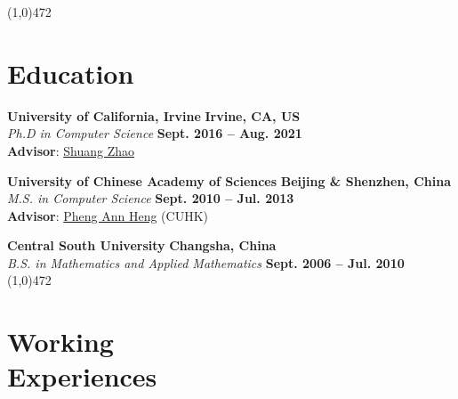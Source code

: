 \documentclass[margin,line]{resume}
\begin{document}
\begin{resume}
    \vspace{-5.0mm}
    \line(1,0){472}
    \vspace{-5.0mm}

    \section{\mysidestyle Education}
    \textbf{University of California, Irvine}       \hfill \textbf{Irvine, CA, US}  \\
    \textsl{Ph.D in Computer Science} 															\hfill \textbf{Sept. 2016 -- Aug. 2021} \\
    \textbf{Advisor}: \href{https://shuangz.com/}{Shuang Zhao} 

    \vspace{-2.0mm}

    \textbf{University of Chinese Academy of Sciences}  \hfill \textbf{Beijing \& Shenzhen, China}\\
    \textsl{M.S. in Computer Science}                 \hfill \textbf{Sept. 2010 -- Jul. 2013} \\
	\textbf{Advisor}: \href{http://www.cse.cuhk.edu.hk/~pheng/}{Pheng Ann Heng} (CUHK)

    \vspace{-2.0mm}

    \textbf{Central South University}      \hfill \textbf{Changsha, China} \\
    \textsl{B.S. in Mathematics and Applied Mathematics}                \hfill \textbf{Sept. 2006 -- Jul. 2010}  \\
    
    \vspace{-9.0mm}
    \line(1,0){472}
    \vspace{-5.0mm}

    \section{\mysidestyle Working \\Experiences}


\end{resume}
\end{document}
